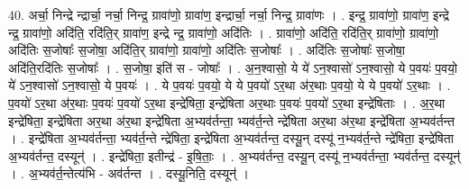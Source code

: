 \documentclass[17pt]{extarticle}
\begin{document}
40. अर्चा॒ निन्द्रे न्द्रार्चा॒ नर्चा॒ निन्द्र॒ ग्रावा॑णो॒ ग्रावा॑ण॒ इन्द्रार्चा॒ नर्चा॒ निन्द्र॒ ग्रावा॑णः । . इन्द्र॒ ग्रावा॑णो॒ ग्रावा॑ण॒ इन्द्रे न्द्र॒ ग्रावा॑णो॒ अदि॑ति॒ रदि॑ति॒र् ग्रावा॑ण॒ इन्द्रे न्द्र॒ ग्रावा॑णो॒ अदि॑तिः । . ग्रावा॑णो॒ अदि॑ति॒ रदि॑ति॒र् ग्रावा॑णो॒ ग्रावा॑णो॒ अदि॑तिः स॒जोषाः᳚ स॒जोषा॒ अदि॑ति॒र् ग्रावा॑णो॒ ग्रावा॑णो॒ अदि॑तिः स॒जोषाः᳚ । . अदि॑तिः स॒जोषाः᳚ स॒जोषा॒ अदि॑ति॒रदि॑तिः स॒जोषाः᳚ । . स॒जोषा॒ इति॑ स - जोषाः᳚ । . अ॒न॒श्वासो॒ ये ये॑ ऽन॒श्वासो॑ ऽन॒श्वासो॒ ये प॒वयः॑ प॒वयो॒ ये॑ ऽन॒श्वासो॑ ऽन॒श्वासो॒ ये प॒वयः॑ । . ये प॒वयः॑ प॒वयो॒ ये ये प॒वयो॑ ऽर॒था अ॑र॒थाः प॒वयो॒ ये ये प॒वयो॑ ऽर॒थाः । . प॒वयो॑ ऽर॒था अ॑र॒थाः प॒वयः॑ प॒वयो॑ ऽर॒था इन्द्रे॑षिता॒ इन्द्रे॑षिता अर॒थाः प॒वयः॑ प॒वयो॑ ऽर॒था इन्द्रे॑षिताः । . अ॒र॒था इन्द्रे॑षिता॒ इन्द्रे॑षिता अर॒था अ॑र॒था इन्द्रे॑षिता अ॒भ्यव॑र्तन्ता॒ भ्यव॑र्त॒न्ते न्द्रे॑षिता अर॒था अ॑र॒था इन्द्रे॑षिता अ॒भ्यव॑र्तन्त । . इन्द्रे॑षिता अ॒भ्यव॑र्तन्ता॒ भ्यव॑र्त॒न्ते न्द्रे॑षिता॒ इन्द्रे॑षिता अ॒भ्यव॑र्तन्त॒ दस्यू॒न् दस्यू॑ न॒भ्यव॑र्त॒न्ते न्द्रे॑षिता॒ इन्द्रे॑षिता अ॒भ्यव॑र्तन्त॒ दस्यून्॑ । . इन्द्रे॑षिता॒ इतीन्द्र॑ - इ॒षि॒ताः॒ । . अ॒भ्यव॑र्तन्त॒ दस्यू॒न् दस्यू॑ न॒भ्यव॑र्तन्ता॒ भ्यव॑र्तन्त॒ दस्यून्॑ । . अ॒भ्यव॑र्त॒न्तेत्य॑भि - अव॑र्तन्त । . दस्यू॒निति॒ दस्यून्॑ । \newline
\pagebreak
\end{document}
